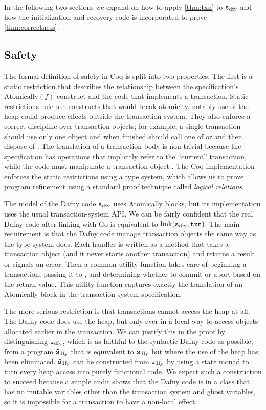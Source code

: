 In the following two sections we expand on how to apply \autoref{thm:txn} to
$\texttt{s}_{\mathrm{dfy}}$ and how the initialization and recovery code is incorporated to prove
\autoref{thm:correctness}.

\subsection{Safety}

The formal definition of safety in Coq is split into two properties. The first
is a static restriction that describes the
relationship between the specification's $\mathrm{Atomically}(f)$ construct and
the code that implements a transaction. Static restrictions rule out constructs
that would break atomicity, notably use of the heap could produce effects
outside the transaction system. They also enforce a correct discipline over
transaction objects; for example, a single transaction should use only one
 object and when finished should call one of  or 
and then dispose of . The translation of a transaction body is
non-trivial because the specification has operations that implicitly refer to
the ``current'' transaction, while the code must manipulate a transaction object
. The Coq implementation enforces the static restrictions using a type
system, which allows us to prove program refinement
using a standard proof technique called \emph{logical relations}.

The model of the Dafny code $\texttt{s}_{\mathrm{dfy}}$ uses Atomically blocks, but its
implementation uses the usual transaction-system API\@. We can be fairly confident
that the real Dafny code after linking with Go is equivalent to $\mathrm{link}(\texttt{s}_{\mathrm{dfy}}, \texttt{txn})$.
The main requirement is that the Dafny code manage transaction objects the same
way as the type system does. Each handler is written as a method that takes a
transaction object (and it never starts another transaction) and returns a
result or signals an error. Then a common utility function  takes
care of beginning a transaction, passing it to , and determining whether
to commit or abort based on the return value. This utility function captures
exactly the translation of an Atomically block in the transaction system specification.

The more serious restriction is that transactions cannot access the heap at all.
The Dafny code does use the heap, but only ever in a local way to access objects
allocated earlier in the transaction. We can justify this in the proof by
distinguishing $\texttt{s}_{\mathrm{dfy}}$, which is as faithful to the syntactic Dafny code as
possible, from a program $\tilde{\texttt{s}}_{\mathrm{dfy}}$ that is equivalent to $\texttt{s}_{\mathrm{dfy}}$ but where the
use of the heap has been eliminated. $\tilde{\texttt{s}}_{\mathrm{dfy}}$ can be constructed from $\texttt{s}_{\mathrm{dfy}}$
by using a state monad to turn every heap access into purely functional code.
We expect such a construction to succeed because
a simple audit shows that the Dafny code is in a class that has no mutable
variables other than the transaction system and ghost variables,
so it is impossible for a transaction to have a non-local effect.

